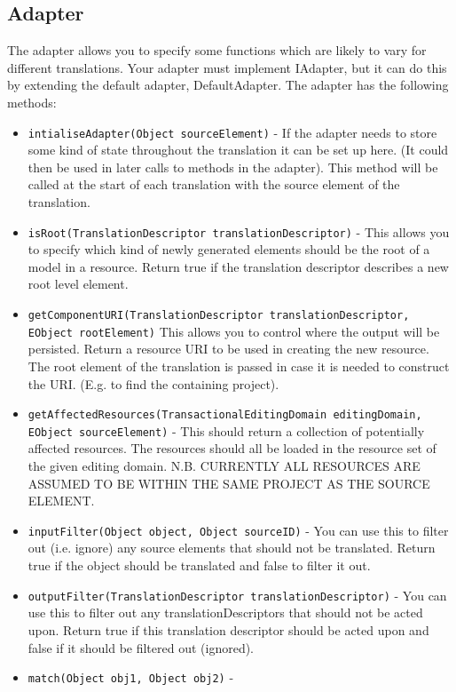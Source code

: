\subsection{Adapter}
\label{sec:adapter}
The adapter allows you to specify some functions which are likely to vary for different translations.
Your adapter must implement IAdapter, but it can do this by extending the default adapter, DefaultAdapter.
The adapter has the following methods:
\begin{itemize}
	\item \texttt{intialiseAdapter(Object sourceElement)} - 
	If the adapter needs to store some kind of state throughout the translation it can be set up here.
	(It could then be used in later calls to methods in the adapter).
 	This method will be called at the start of each translation with the source element of the translation.
 	\item \texttt{isRoot(TranslationDescriptor translationDescriptor)} - 
 	This allows you to specify which kind of newly generated elements should be the root of a model in a resource.
 	Return true if the translation descriptor describes a new root level element.
 	\item \texttt{getComponentURI(TranslationDescriptor translationDescriptor, EObject rootElement)}
 	This allows you to control where the output will be persisted.
 	Return a resource URI to be used in creating the new resource.
 	The root element of the translation is passed in case it is needed to construct the URI. 
 	(E.g. to find the containing project).
 	\item \texttt{getAffectedResources(TransactionalEditingDomain editingDomain, EObject sourceElement)} -
 	This should return a collection of potentially affected resources.
 	The resources should all be loaded in the resource set of the given editing domain.
 	N.B. CURRENTLY ALL RESOURCES ARE ASSUMED TO BE WITHIN THE SAME PROJECT AS THE SOURCE ELEMENT. 
 	\item \texttt{inputFilter(Object object, Object sourceID)} -
 	You can use this to filter out (i.e. ignore) any source elements that should not be translated.
 	Return true if the object should be translated and false to filter it out.
 	\item \texttt{outputFilter(TranslationDescriptor translationDescriptor)} -
 	You can use this to filter out any translationDescriptors that should not be acted upon.
 	Return true if this translation descriptor should be acted upon and false if it should be filtered out (ignored).
 	\item \texttt{match(Object obj1, Object obj2)} -

\end{itemize}
